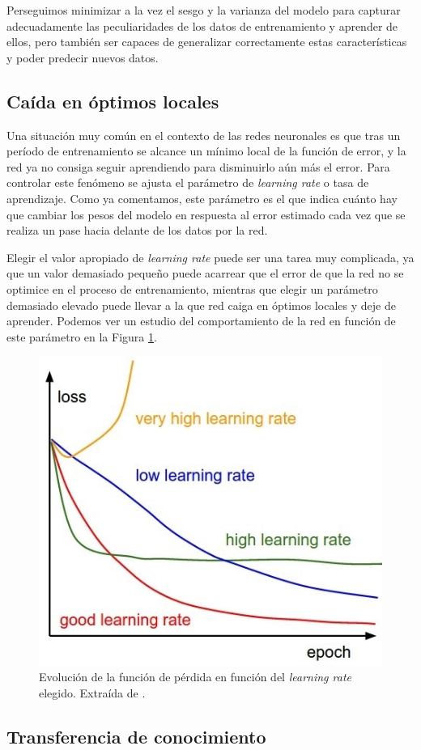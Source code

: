 \documentclass[
  a4paper,
  12pt,
  spanish,
]{scrartcl}
\theoremstyle{teorema-style}
\begin{document}
Perseguimos minimizar a la vez el sesgo y la varianza del modelo para capturar adecuadamente las peculiaridades de los datos de entrenamiento y aprender de ellos, pero también ser capaces de generalizar correctamente estas características y poder predecir nuevos datos.

\subsection{Caída en óptimos locales}

Una situación muy común en el contexto de las redes neuronales es que tras un período de entrenamiento se alcance un mínimo local de la función de error, y la red ya no consiga seguir aprendiendo para disminuirlo aún más el error. Para controlar este fenómeno se ajusta el parámetro de \textit{learning rate} o tasa de aprendizaje. Como ya comentamos, este parámetro es el que indica cuánto hay que cambiar los pesos del modelo en respuesta al error estimado cada vez que se realiza un pase hacia delante de los datos por la red.

Elegir el valor apropiado de \textit{learning rate} puede ser una tarea muy complicada, ya que un valor demasiado pequeño puede acarrear que el error de que la red no se optimice en el proceso de entrenamiento, mientras que elegir un parámetro demasiado elevado puede llevar a la que red caiga en óptimos locales y deje de aprender. Podemos ver un estudio del comportamiento de la red en función de este parámetro en la Figura \ref{fig:learning-rate}.

\begin{figure}[h]
  \centering
  \includegraphics[width=.5\textwidth]{img/learning-rate}
  \caption{Evolución de la función de pérdida en función del \textit{learning rate} elegido. Extraída de \parencite{quora_lr_2017}.}
  \label{fig:learning-rate}
\end{figure}

\subsection{Transferencia de conocimiento}
\end{document}
